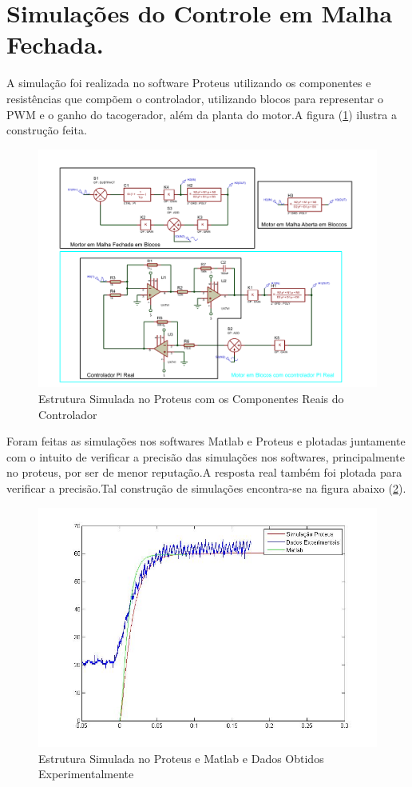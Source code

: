 \documentclass[11pt, a4paper, oneside]{article}
\begin{document}
\section{Simulações do Controle em Malha Fechada.}
A simulação foi realizada no software Proteus utilizando os componentes e resistências que compõem o controlador, utilizando blocos para representar o PWM e o ganho do tacogerador, além da planta do motor.A figura (\ref{Circ_proteus}) ilustra a construção feita.

\begin{figure}[h!]
\centering
\includegraphics[width=.9\textwidth]{circuito_proteus.pdf}
\caption{Estrutura Simulada no Proteus com os Componentes Reais do Controlador}
\label{Circ_proteus}
\end{figure}

Foram feitas as simulações nos softwares Matlab e Proteus e plotadas juntamente com o intuito de verificar a precisão das simulações nos softwares, principalmente no proteus, por ser de menor reputação.A resposta real também foi plotada para verificar a precisão.Tal construção de simulações encontra-se na figura abaixo (\ref{sim_pro_mat}).


\begin{figure}[h!]
\centering
\includegraphics[width=.7\textwidth]{Comparacao_mat_pro_real_m_fechada.jpg}
\caption{Estrutura Simulada no Proteus e Matlab e Dados Obtidos Experimentalmente}
\label{sim_pro_mat}
\end{figure}
\end{document}
